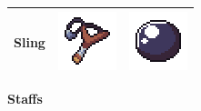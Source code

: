 \documentclass[../Main.tex]{subfiles}
\begin{document}
\begin{center}
\begin{tabular}{ | m{} | m{} | m{} | }
                    \hline
                    \textbf{Sling} & \centerline{\includegraphics[scale=1]{../res/textures/items/weapons/Sling.png}} & \centerline{\includegraphics[scale=3]{../res/textures/projectiles/Rock.png}} \\
                    \hline
                \end{tabular}
            \end{center}
            \clearpage
            \textbf{Staffs}
\end{document}
